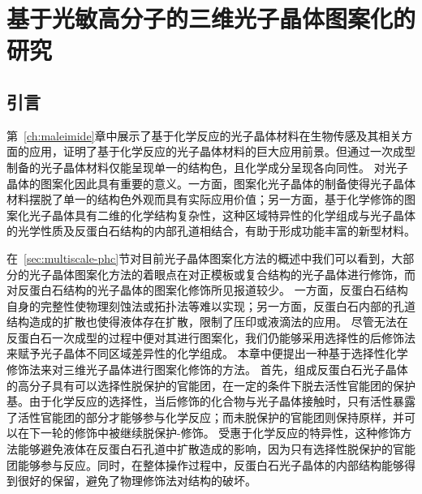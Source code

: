 
\chapter{基于光敏高分子的三维光子晶体图案化的研究}
\label{ch:photoactive}

\section{引言}
第~\ref{ch:maleimide}章中展示了基于化学反应的光子晶体材料在生物传感及其相关方面的应用，证明了基于化学反应的光子晶体材料的巨大应用前景。但通过一次成型制备的光子晶体材料仅能呈现单一的结构色，且化学成分呈现各向同性。
对光子晶体的图案化因此具有重要的意义。一方面，图案化光子晶体的制备使得光子晶体材料摆脱了单一的结构色外观而具有实际应用价值；另一方面，基于化学修饰的图案化光子晶体具有二维的化学结构复杂性，这种区域特异性的化学组成与光子晶体的光学性质及反蛋白石结构的内部孔道相结合，有助于形成功能丰富的新型材料。

在~\ref{sec:multiscale-phc}节对目前光子晶体图案化方法的概述中我们可以看到，大部分的光子晶体图案化方法的着眼点在对正模板或复合结构的光子晶体进行修饰，而对反蛋白石结构的光子晶体的图案化修饰所见报道较少。
一方面，反蛋白石结构自身的完整性使物理刻蚀法或拓扑法等难以实现；另一方面，反蛋白石内部的孔道结构造成的扩散也使得液体存在扩散，限制了压印或液滴法的应用。
尽管无法在反蛋白石一次成型的过程中便对其进行图案化，我们仍能够采用选择性的后修饰法来赋予光子晶体不同区域差异性的化学组成。
本章中便提出一种基于选择性化学修饰法来对三维光子晶体进行图案化修饰的方法。
首先，组成反蛋白石光子晶体的高分子具有可以选择性脱保护的官能团，在一定的条件下脱去活性官能团的保护基。由于化学反应的选择性，当后修饰的化合物与光子晶体接触时，只有活性暴露了活性官能团的部分才能够参与化学反应；而未脱保护的官能团则保持原样，并可以在下一轮的修饰中被继续脱保护-修饰。
受惠于化学反应的特异性，这种修饰方法能够避免液体在反蛋白石孔道中扩散造成的影响，因为只有选择性脱保护的官能团能够参与反应。同时，在整体操作过程中，反蛋白石光子晶体的内部结构能够得到很好的保留，避免了物理修饰法对结构的破坏。

